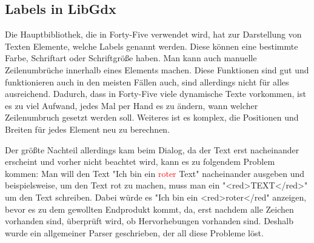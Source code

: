 
\renewcommand{\kapitelautor}{Autor: Felix Zwickelstorfer}
\subsection{Labels in LibGdx}\label{subsec:labels-in-gdx}
\renewcommand{\kapitelautor}{Autor: Felix Zwickelstorfer}

Die Hauptbibliothek, die in Forty-Five verwendet wird, hat zur Darstellung von Texten Elemente, welche Labels genannt werden.
Diese können eine bestimmte Farbe, Schriftart oder Schriftgröße haben.
Man kann auch manuelle Zeilenumbrüche innerhalb eines Elements machen.
Diese Funktionen sind gut und funktionieren auch in den meisten Fällen auch, sind allerdings nicht für alles ausreichend.
Dadurch, dass in Forty-Five viele dynamische Texte vorkommen, ist es zu viel Aufwand, jedes Mal per Hand es zu ändern, wann welcher Zeilenumbruch gesetzt werden soll.
Weiteres ist es komplex, die Positionen und Breiten für jedes Element neu zu berechnen.

Der größte Nachteil allerdings kam beim Dialog, da der Text erst nacheinander erscheint und vorher nicht beachtet wird, kann es zu folgendem Problem kommen:
Man will den Text "Ich bin ein \textcolor{red}{roter} Text" nacheinander ausgeben und beispielsweise, um den Text rot zu machen, muss man ein "<red>TEXT</red>" um den Text schreiben.
Dabei würde es "Ich bin ein <red>roter</red" anzeigen, bevor es zu dem gewollten Endprodukt kommt, da, erst nachdem alle Zeichen vorhanden sind, überprüft wird, ob Hervorhebungen vorhanden sind.
Deshalb wurde ein allgemeiner Parser geschrieben, der all diese Probleme löst.